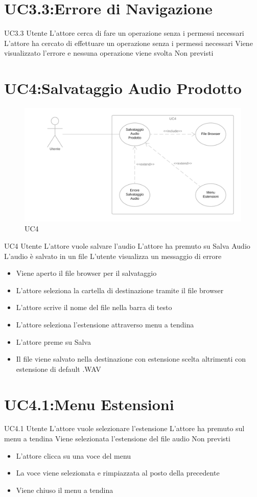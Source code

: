 \documentclass[../AnalisideiRequisiti.tex]{subfiles}
\begin{document}
\section{UC3.3:Errore di Navigazione}
\UserCase
{UC3.3}
{Utente}
{}
{L'attore cerca di fare un operazione senza i permessi necessari}
{L'attore ha cercato di effettuare un operazione senza i permessi necessari}
{Viene visualizzato l'errore e nessuna operazione viene svolta}
{Non previsti}
{}

\section{UC4:Salvataggio Audio Prodotto}
\begin{figure}[htp]
	\caption{UC4}
	\centering
	\includegraphics[width=\textwidth]{../img/UC04.png}
\end{figure}
\UserCase
{UC4}
{Utente}
{}
{L'attore vuole salvare l'audio}
{L'attore ha premuto su Salva Audio}
{L'audio è salvato in un file}
{L'utente visualizza un messaggio di errore }
{
		\begin{itemize}
		\item{} Viene aperto il file browser per il salvataggio
		\item{} L'attore seleziona la cartella di destinazione tramite il file browser 
		\item{} L'attore scrive il nome del file nella barra di testo
		\item{} L'attore seleziona l'estensione attraverso menu a tendina
		\item{} L'attore preme su Salva 
		\item{} Il file viene salvato nella destinazione con estensione scelta altrimenti con estensione di default .WAV
\end{itemize}
}
\section{UC4.1:Menu Estensioni}
\UserCase
{UC4.1}
{Utente}
{}
{L'attore vuole selezionare l'estensione}
{L'attore ha premuto sul menu a tendina}
{Viene selezionata l'estensione del file audio}
{Non previsti}
{
\begin{itemize}
	\item{} L'attore clicca su una voce del menu
	\item{} La voce viene selezionata e rimpiazzata al posto della precedente
	\item{} Viene chiuso il menu a tendina

\end{itemize}
}		
\end{document}
